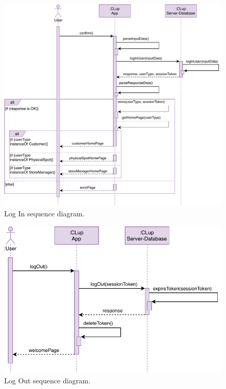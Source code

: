 \begin{figure}[H]
    \centering
    \includegraphics[width=1.0\textwidth]{images/logIn_sequence_diagram.pdf}
    \caption{Log In sequence diagram.}
\end{figure}

\begin{figure}[H]
    \centering
    \includegraphics[width=1.0\textwidth]{images/logOut_sequence_diagram.pdf}
    \caption{Log Out sequence diagram.}
\end{figure}


